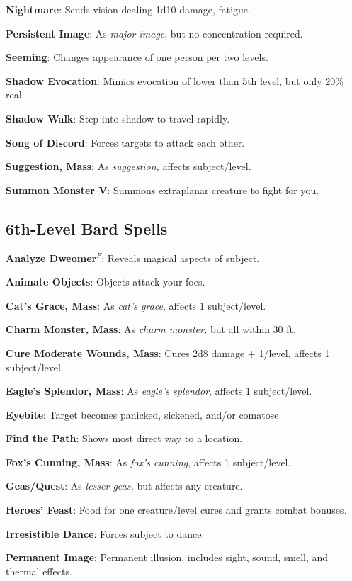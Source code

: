 \textbf{Nightmare}: Sends vision dealing 1d10 damage, fatigue.

\textbf{Persistent Image}: As \textit{major image}, but no concentration required.

\textbf{Seeming}: Changes appearance of one person per two levels.

\textbf{Shadow Evocation}: Mimics evocation of lower than 5th level, but only 20\% real.

\textbf{Shadow Walk}: Step into shadow to travel rapidly.

\textbf{Song of Discord}: Forces targets to attack each other.

\textbf{Suggestion, Mass}: As \textit{suggestion, }affects subject/level.

\textbf{Summon Monster V}: Summons extraplanar creature to fight for you.

\subsection{6th-Level Bard Spells}


\textbf{Analyze Dweomer}\(^{F}\): Reveals magical aspects of subject.

\textbf{Animate Objects}: Objects attack your foes.

\textbf{Cat's Grace, Mass}: As \textit{cat's grace}, affects 1 subject/level.

\textbf{Charm Monster, Mass}: As \textit{charm monster, }but all within 30 ft.

\textbf{Cure Moderate Wounds, Mass}: Cures 2d8 damage + 1/level, affects 1 subject/level.

\textbf{Eagle's Splendor, Mass}: As \textit{eagle's splendor}, affects 1 subject/level.

\textbf{Eyebite}: Target becomes panicked, sickened, and/or comatose.

\textbf{Find the Path}: Shows most direct way to a location.

\textbf{Fox's Cunning, Mass}: As \textit{fox's cunning}, affects 1 subject/level.

\textbf{Geas/Quest}: As \textit{lesser geas, }but affects any creature.

\textbf{Heroes' Feast}: Food for one creature/level cures and grants combat bonuses\textit{.}

\textbf{Irresistible Dance}: Forces subject to dance.

\textbf{Permanent Image}: Permanent illusion, includes sight, sound, smell, and thermal effects.

